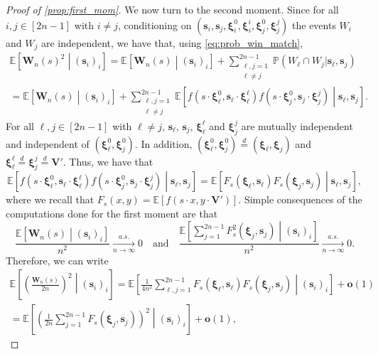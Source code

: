 \documentclass[11pt,a4paper,oneside]{article}
\theoremstyle{definition}
\theoremstyle{remark}
\def\E{\mathbb{E}}
\def\P{\mathbb{P}}
\begin{document}
\begin{proof}[Proof of \cref{prop:first_mom}]
We now turn to the second moment. 
Since for all $i,j\in [2n-1]$ with $i\neq j$, conditioning on $(\bm s_i,\bm s_j, \bm \xi^{0}_i,\bm \xi^{i}_i,\bm \xi^{0}_j,\bm \xi^{j}_j)$ the events $W_i$ and $W_j$ are independent, we have that, using \cref{eq:prob_win_match},
\begin{multline}
\E\left[\bm W_n(s)^2\middle| (\bm s_i)_i\right]=\E\left[\bm W_n(s)\middle| (\bm s_i)_i\right]+\sum_{\substack{\ell,j=1\\ \ell\neq j}}^{2n-1}\P(W_\ell\cap W_j | \bm s_\ell,\bm s_j)\\
=\E\left[\bm W_n(s)\middle| (\bm s_i)_i\right]+\sum_{\substack{\ell,j=1\\ \ell\neq j}}^{2n-1}\E\left[f\left(s\cdot \bm \xi^{0}_\ell,\bm s_\ell\cdot \bm \xi^\ell_\ell\right)f\left(s\cdot \bm \xi^{0}_j,\bm s_j\cdot \bm \xi^j_j\right)\middle| \bm s_\ell,\bm s_j\right].
\end{multline}
For all $\ell,j\in [2n-1]$ with $\ell\neq j$, $\bm s_\ell$, $\bm s_j$, $\bm \xi^\ell_\ell$ and $\bm \xi^j_j$ are mutually independent and independent of $(\bm \xi^{0}_\ell,\bm \xi^{0}_j)$. In addition, $(\bm \xi^{0}_\ell,\bm \xi^{0}_j)\stackrel{d}{=}(\bm \xi_\ell,\bm \xi_j)$ and $\bm \xi^\ell_\ell\stackrel{d}{=}\bm \xi^j_j\stackrel{d}{=}\bm V'$. Thus, we have that
\begin{equation}
\E\left[f\left(s\cdot \bm \xi^{0}_\ell,\bm s_\ell\cdot \bm \xi^\ell_\ell\right)f\left(s\cdot \bm \xi^{0}_j,\bm s_j\cdot \bm \xi^j_j\right)\middle| \bm s_\ell,\bm s_j\right]
=\E\left[F_s\left(\bm \xi_\ell,\bm s_\ell\right)F_s\left(\bm \xi_j,\bm s_j\right)\middle| \bm s_\ell,\bm s_j\right],
\end{equation}
where we recall that  $F_s(x,y)=\E\left[f\left(s\cdot x,y\cdot \bm V'\right)\right]$.
Simple consequences of the computations done for the first moment are that 
$$\frac{\E\left[\bm W_n(s)\middle| (\bm s_i)_i\right]}{n^2}\xrightarrow[n\to\infty]{a.s.} 0\quad\text{and}\quad\frac{\E\left[\sum_{j=1}^{2n-1} F_s^2 (\bm \xi_j, \bm s_j)\middle| (\bm s_i)_i\right]}{n^2}\xrightarrow[n\to\infty]{a.s.} 0.$$ Therefore, we can write
\begin{multline}\label{eq:fbnwiruefbeownfw}
\E\left[\left(\frac{\bm W_n(s)}{2n}\right)^2\middle| (\bm s_i)_i\right]=
\E\left[\frac{1}{4n^2}\sum_{\ell,j=1}^{2n-1}F_s\left(\bm \xi_\ell,\bm s_\ell\right) F_s\left(\bm \xi_j,\bm s_j\right)\middle| (\bm s_i)_i\right]+\bm o(1)\\
= 
\E\left[\left(\frac{1}{2n}\sum_{j=1}^{2n-1} F_s\left(\bm \xi_j,\bm s_j\right)\right)^2\middle| (\bm s_i)_i\right]+\bm o(1),

\end{multline}
\end{proof}
\end{document}
